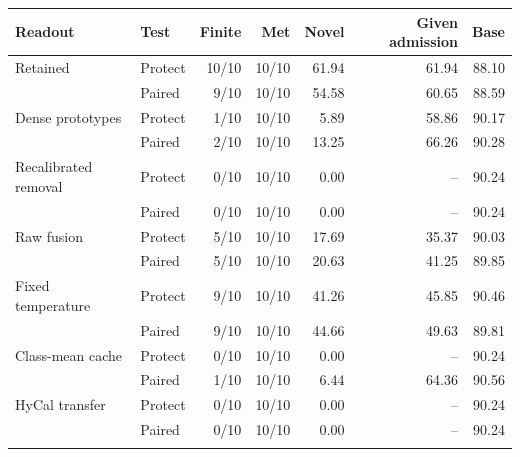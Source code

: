 \begin{tabular}{@{}llrrrrr@{}}
\toprule
Readout & Test & Finite & Met & Novel & Given admission & Base \\
\midrule
Retained & Protect & 10/10 & 10/10 & 61.94 & 61.94 & 88.10 \\
 & Paired & 9/10 & 10/10 & 54.58 & 60.65 & 88.59 \\
\addlinespace[2pt]
Dense prototypes & Protect & 1/10 & 10/10 & 5.89 & 58.86 & 90.17 \\
 & Paired & 2/10 & 10/10 & 13.25 & 66.26 & 90.28 \\
\addlinespace[2pt]
Recalibrated removal & Protect & 0/10 & 10/10 & 0.00 & -- & 90.24 \\
 & Paired & 0/10 & 10/10 & 0.00 & -- & 90.24 \\
\addlinespace[2pt]
Raw fusion & Protect & 5/10 & 10/10 & 17.69 & 35.37 & 90.03 \\
 & Paired & 5/10 & 10/10 & 20.63 & 41.25 & 89.85 \\
\addlinespace[2pt]
Fixed temperature & Protect & 9/10 & 10/10 & 41.26 & 45.85 & 90.46 \\
 & Paired & 9/10 & 10/10 & 44.66 & 49.63 & 89.81 \\
\addlinespace[2pt]
Class-mean cache & Protect & 0/10 & 10/10 & 0.00 & -- & 90.24 \\
 & Paired & 1/10 & 10/10 & 6.44 & 64.36 & 90.56 \\
\addlinespace[2pt]
HyCal transfer & Protect & 0/10 & 10/10 & 0.00 & -- & 90.24 \\
 & Paired & 0/10 & 10/10 & 0.00 & -- & 90.24 \\
\addlinespace[2pt]
\bottomrule
\end{tabular}

